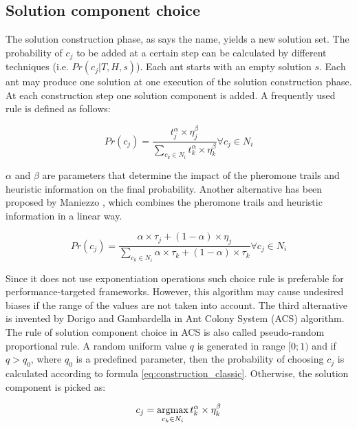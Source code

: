\documentclass[11pt,a4paper,oneside]{book}
\begin{document}
\subsection{Solution component choice}

The solution construction phase, as says the name, yields a new solution set. The probability of $c_j$ to be added at a certain step can be calculated by different techniques (i.e. $Pr(c_j|T,H,s)$). Each ant starts with an empty solution $s$. Each ant may produce one solution at one execution of the solution construction phase. At each construction step one solution component is added. A frequently used rule is defined as follows:

\begin{equation}
Pr(c_j)=\frac{t_j^\alpha \times \eta_j^\beta}{\sum \limits_{c_k \in N_i} t_k^\alpha \times \eta_k^\beta} \forall c_j \in N_i
\label{eq:construction_classic}
\end{equation}

$\alpha$ and $\beta$ are parameters that determine the impact of the pheromone trails and heuristic information on the final probability. Another alternative has been proposed by Maniezzo \cite{maniezzo}, which combines the pheromone trails and heuristic information in a linear way.

\begin{equation}
Pr(c_j)=\frac{\alpha \times \tau_j + (1-\alpha) \times \eta_j}{\sum \limits_{c_k \in N_i} \alpha \times \tau_k + (1-\alpha) \times \tau_k} \forall c_j \in N_i
\end{equation}

Since it does not use exponentiation operations such choice rule is preferable for performance-targeted frameworks. However, this algorithm may cause undesired biases if the range of the values are not taken into account. The third alternative is invented by Dorigo and Gambardella \cite{dorigo} in Ant Colony System (ACS) algorithm. The rule of solution component choice in ACS is also called pseudo-random proportional rule. A random uniform value $q$ is generated in range $[0;1)$ and if $q>q_0$, where $q_0$ is a predefined parameter, then the probability of choosing $c_j$ is calculated according to formula \eqref{eq:construction_classic}. Otherwise, the solution component is picked as:

\begin{equation}
c_j = \operatornamewithlimits{argmax}\limits_{c_k \in N_i} t_k^\alpha \times \eta_k^\beta
\label{eq:construction_dorigo}
\end{equation}
\end{document}
